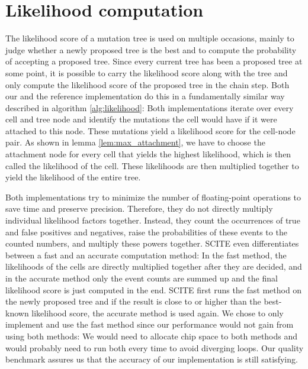 \section{Likelihood computation}
\label{sec:scoring}

The likelihood score of a mutation tree is used on multiple occasions, mainly to judge whether a newly proposed tree is the best and to compute the probability of accepting a proposed tree. Since every current tree has been a proposed tree at some point, it is possible to carry the likelihood score along with the tree and only compute the likelihood score of the proposed tree in the chain step. Both our and the reference implementation do this in a fundamentally similar way described in algorithm \ref{alg:likelihood}: Both implementations iterate over every cell and tree node and identify the mutations the cell would have if it were attached to this node. These mutations yield a likelihood score for the cell-node pair. As shown in lemma \ref{lem:max_attachment}, we have to choose the attachment node for every cell that yields the highest likelihood, which is then called the likelihood of the cell. These likelihoods are then multiplied together to yield the likelihood of the entire tree.

Both implementations try to minimize the number of floating-point operations to save time and preserve precision. Therefore, they do not directly multiply individual likelihood factors together. Instead, they count the occurrences of true and false positives and negatives, raise the probabilities of these events to the counted numbers, and multiply these powers together. \ac{SCITE} even differentiates between a fast and an accurate computation method: In the fast method, the likelihoods of the cells are directly multiplied together after they are decided, and in the accurate method only the event counts are summed up and the final likelihood score is just computed in the end. \ac{SCITE} first runs the fast method on the newly proposed tree and if the result is close to or higher than the best-known likelihood score, the accurate method is used again. We chose to only implement and use the fast method since our performance would not gain from using both methods: We would need to allocate chip space to both methods and would probably need to run both every time to avoid diverging loops. Our quality benchmark assures us that the accuracy of our implementation is still satisfying.


